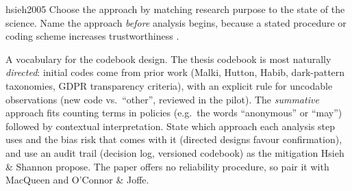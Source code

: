 \begin{papercard}{hsieh2005}
 Choose the approach by matching research purpose to the state of the science. Name the approach \emph{before} analysis begins, because a stated procedure or coding scheme increases trustworthiness .

 A vocabulary for the codebook design. The thesis codebook is most naturally \emph{directed}: initial codes come from prior work (Malki, Hutton, Habib, dark-pattern taxonomies, GDPR transparency criteria), with an explicit rule for uncodable observations (new code vs.\ ``other'', reviewed in the pilot). The \emph{summative} approach fits counting terms in policies (e.g.\ the words ``anonymous'' or ``may'') followed by contextual interpretation. State which approach each analysis step uses and the bias risk that comes with it (directed designs favour confirmation), and use an audit trail (decision log, versioned codebook) as the mitigation Hsieh \& Shannon propose. The paper offers no reliability procedure, so pair it with MacQueen and O'Connor \& Joffe.
\end{papercard}
